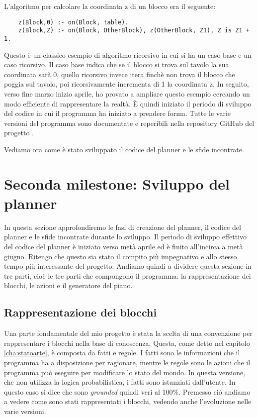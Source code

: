 L'algoritmo per calcolare la coordinata z di un blocco era il seguente:
\begin{verbatim}
    z(Block,0) :- on(Block, table).
    z(Block,Z) :- on(Block, OtherBlock), z(OtherBlock, Z1), Z is Z1 + 1.
\end{verbatim}
Questo è un classico esempio di algoritmo ricorsivo in cui si ha un caso base e un caso ricorsivo. Il caso base indica che se il blocco si trova sul tavolo la sua coordinata sarà 0, quello ricorsivo invece itera finchè non trova il blocco che poggia sul tavolo, poi ricorsivamente incrementa di 1 la coordinata z.
In seguito, verso fine marzo inizio aprile, ho provato a ampliare questo esempio cercando un modo efficiente di rappresentare la realtà. È quindi iniziato il periodo di sviluppo del codice in cui il programma ha iniziato a prendere forma. Tutte le varie versioni del programma sono documentate e reperibili nella repository GitHub del progetto \cite{gitrepo}.

Vediamo ora come è stato sviluppato il codice del planner e le sfide incontrate.
\section{Seconda milestone: Sviluppo del planner}
\label{sec:sviluppoplanner}
In questa sezione approfondiremo le fasi di creazione del planner, il codice del planner e le sfide incontrate durante lo sviluppo.
Il periodo di sviluppo effettivo del codice del planner è iniziato verso metà aprile ed è finito all'incirca a metà giugno. Ritengo che questo sia stato il compito più impegnativo e allo stesso tempo più interessante del progetto.
Andiamo quindi a dividere questa sezione in tre parti, cioè le tre parti che compongono il programma: la rappresentazione dei blocchi, le azioni e il generatore del piano.

\subsection{Rappresentazione dei blocchi}
\label{subsec:rapprblocchi}
Una parte fondamentale del mio progetto è stata la scelta di una convenzione per rappresentare i blocchi nella base di conoscenza. Questa, come detto nel capitolo \ref{cha:statoarte}, è composta da fatti e regole. I fatti sono le informazioni che il programma ha a disposizione per ragionare, mentre le regole sono le azioni che il programma può eseguire per modificare lo stato del mondo.
In questa versione, che non utilizza la logica probabilistica, i fatti sono istanziati dall'utente. In questo caso si dice che sono \textit{grounded} quindi veri al 100\%.
Premesso ciò andiamo a vedere come sono stati rappresentati i blocchi, vedendo anche l'evoluzione nelle varie versioni.

